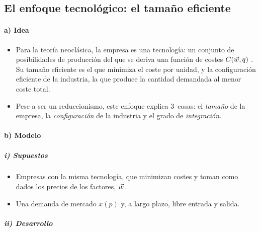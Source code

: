 \documentclass[11pt]{article}
\begin{document}
\subsection{El enfoque tecnológico: el tamaño eficiente}\label{sec:tamano-eficiente}

\paragraph{a) Idea}

\begin{itemize}
\item Para la teoría neoclásica, la empresa es una tecnología: un conjunto de posibilidades de producción  del que se deriva una función de costes $C(\vec{w},q)$ . Su tamaño eficiente es el que minimiza el coste por unidad, y la configuración eficiente de la industria, la que produce la cantidad demandada al menor coste total.
\item Pese a ser un reduccionismo, este enfoque explica 3~cosas: el \emph{tamaño} de la empresa, la \emph{configuración} de la industria y el grado de \emph{integración}.
\end{itemize}

\paragraph{b) Modelo}

\subparagraph{i) Supuestos}

\begin{itemize}
\item Empresas con la misma tecnología, que minimizan costes y toman como dados los precios de los factores, $\vec{w}$.
\item Una demanda de mercado $x(p)$ y, a largo plazo, libre entrada y salida.
\end{itemize}

\subparagraph{ii) Desarrollo}
\end{document}
